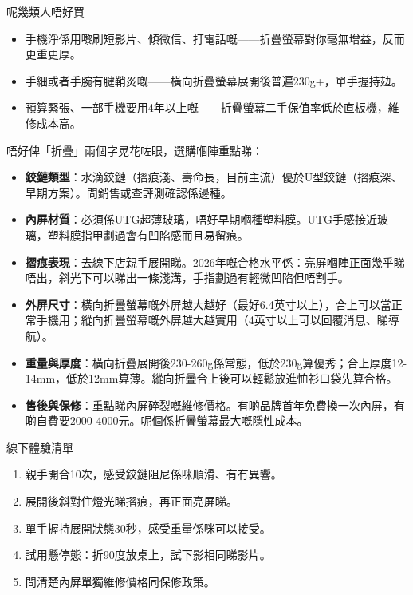 \begin{tcbwarn}{呢幾類人唔好買}
\begin{itemize}
  \item 手機淨係用嚟刷短影片、傾微信、打電話嘅——折疊螢幕對你毫無增益，反而更重更厚。
  \item 手細或者手腕有腱鞘炎嘅——橫向折疊螢幕展開後普遍230g+，單手握持攰。
  \item 預算緊張、一部手機要用4年以上嘅——折疊螢幕二手保值率低於直板機，維修成本高。
\end{itemize}

\end{tcbwarn}


唔好俾「折疊」兩個字晃花咗眼，選購嗰陣重點睇：

\begin{itemize}
  \item \textbf{鉸鏈類型}：水滴鉸鏈（摺痕淺、壽命長，目前主流）優於U型鉸鏈（摺痕深、早期方案）。問銷售或查評測確認係邊種。
  \item \textbf{內屏材質}：必須係UTG超薄玻璃，唔好早期嗰種塑料膜。UTG手感接近玻璃，塑料膜指甲劃過會有凹陷感而且易留痕。
  \item \textbf{摺痕表現}：去線下店親手展開睇。2026年嘅合格水平係：亮屏嗰陣正面幾乎睇唔出，斜光下可以睇出一條淺溝，手指劃過有輕微凹陷但唔割手。
  \item \textbf{外屏尺寸}：橫向折疊螢幕嘅外屏越大越好（最好6.4英寸以上），合上可以當正常手機用；縱向折疊螢幕嘅外屏越大越實用（4英寸以上可以回覆消息、睇導航）。
  \item \textbf{重量與厚度}：橫向折疊展開後230-260g係常態，低於230g算優秀；合上厚度12-14mm，低於12mm算薄。縱向折疊合上後可以輕鬆放進恤衫口袋先算合格。
  \item \textbf{售後與保修}：重點睇內屏碎裂嘅維修價格。有啲品牌首年免費換一次內屏，有啲自費要2000-4000元。呢個係折疊螢幕最大嘅隱性成本。
\end{itemize}

\begin{tcbpractice}{線下體驗清單}
\begin{enumerate}
  \item 親手開合10次，感受鉸鏈阻尼係咪順滑、有冇異響。
  \item 展開後斜對住燈光睇摺痕，再正面亮屏睇。
  \item 單手握持展開狀態30秒，感受重量係咪可以接受。
  \item 試用懸停態：折90度放桌上，試下影相同睇影片。
  \item 問清楚內屏單獨維修價格同保修政策。
\end{enumerate}

\end{tcbpractice}

